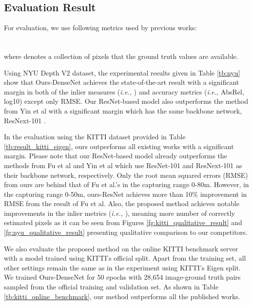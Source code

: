 \documentclass[10pt,twocolumn,letterpaper]{article}
\begin{document}
\subsection{Evaluation Result}
For evaluation, we use following metrics used by previous works:\\

 \\

 \\


where  denotes a collection of pixels that the ground truth values are available.

Using NYU Depth V2 dataset, the experimental results given in Table \ref{tb:nyu} show that Ours-DenseNet achieves the state-of-the-art result with a significant margin in both of the inlier measures (\textit{i.e.,} ) and accuracy metrics (\textit{i.e.,} AbsRel, log10) except only RMSE. Our ResNet-based model also outperforms the method from Yin et al \cite{yin2019enforcing} with a significant margin which has the same backbone network, ResNext-101 \cite{xie2017cvpr}.

In the evaluation using the KITTI dataset provided in Table \ref{tb:result_kitti_eigen}, ours outperforms all existing works with a significant margin.
Please note that our ResNet-based model already outperforms the methods from Fu et al \cite{fu2018deep} and Yin et al \cite{yin2019enforcing} which use ResNet-101 and ResNext-101 \cite{xie2017cvpr} as their backbone network, respectively.
Only the root mean squared errors (RMSE) from ours are behind that of Fu et al.'s in the capturing range 0-80m.
However, in the capturing range 0-50m, ours-ResNet achieves more than 10\% improvement in RMSE from the result of Fu et al.
Also, the proposed method achieves notable improvements in the inlier metrics (\textit{i.e.,} ), meaning more number of correctly estimated pixels as it can be seen from Figures \ref{fg:kitti_qualitative_result} and \ref{fg:nyu_qualitative_result} presenting qualitative comparison to our competitors.



We also evaluate the proposed method on the online KITTI benchmark server with a model trained using KITTI's official split.
Apart from the training set, all other settings remain the same as in the experiment using KITTI's Eigen split.
We trained Ours-DenseNet for 50 epochs with 28,654 image-ground truth pairs sampled from the official training and validation set.
As shown in Table \ref{tb:kitti_online_benchmark}, our method outperforms all the published works.
\end{document}
